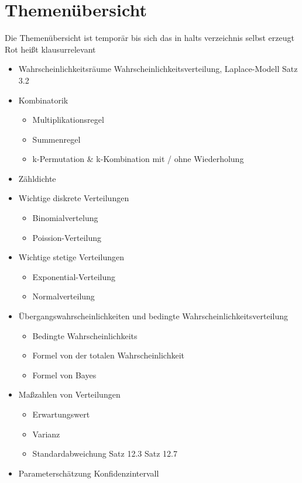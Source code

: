 \section{Themenübersicht}
Die Themenübersicht ist temporär bis sich das in halts verzeichnis selbst erzeugt
Rot heißt klausurrelevant
\begin{itemize}
    \item Wahrscheinlichkeitsräume Wahrscheinlichkeitsverteilung, Laplace-Modell Satz 3.2
    \item Kombinatorik
    \begin{itemize}
        \item Multiplikationsregel
        \item Summenregel
        \item k-Permutation \& k-Kombination mit / ohne Wiederholung
    \end{itemize}
    \item Zähldichte
    \item Wichtige diskrete Verteilungen
    \begin{itemize}
        \item Binomialvertelung
        \item Poission-Verteilung
    \end{itemize}
    \item Wichtige stetige Verteilungen
    \begin{itemize}
        \item Exponential-Verteilung
        \item Normalverteilung
    \end{itemize}
    \item Übergangswahrscheinlichkeiten und bedingte Wahrscheinlichkeitsverteilung
    \begin{itemize}
        \item Bedingte Wahrscheinlichkeits
        \item Formel von der totalen Wahrscheinlichkeit
        \item Formel von Bayes
    \end{itemize}
    \item Maßzahlen von Verteilungen
    \begin{itemize}
        \item Erwartungswert
        \item Varianz
        \item Standardabweichung Satz 12.3 Satz 12.7
    \end{itemize}
    \item Parameterschätzung Konfidenzintervall
\end{itemize}